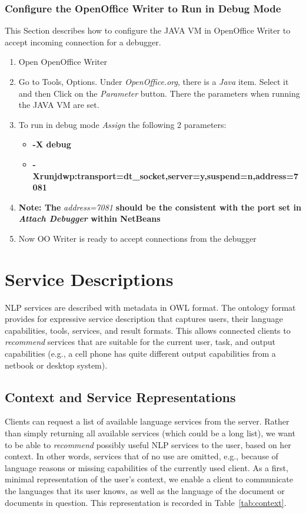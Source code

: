 \subsubsection{Configure the OpenOffice Writer to Run in Debug Mode}
This Section describes how to configure the JAVA VM in OpenOffice Writer to accept incoming connection for a debugger.

\begin{enumerate}
  \item Open OpenOffice Writer
  \item Go to Tools, Options. Under \emph{OpenOffice.org}, there is a \emph{Java} item. Select it and then Click on the 
        \emph{Parameter} button. There the parameters when running the JAVA VM are set.
  \item To run in debug mode \emph{Assign} the following 2 parameters:
  \begin{itemize}
    \item \textbf{-X debug}
    \item \textbf{-Xrunjdwp:transport=dt\_socket,server=y,suspend=n,address=7081}
  \end{itemize}
  \item \textbf{Note: The} \emph{address=7081} \textbf{should be the consistent with the port set in \emph{Attach Debugger} within NetBeans}
  \item  Now OO Writer is ready to accept connections from the debugger

\end{enumerate} 


\section{Service Descriptions}\label{sec:owl}
NLP services are described with metadata in OWL format. The ontology
format provides for expressive service description that captures
users, their language capabilities, tools, services, and result
formats. This allows connected clients to \emph{recommend} services
that are suitable for the current user, task, and output capabilities
(e.g., a cell phone has quite different output capabilities from a
netbook or desktop system). 


\subsection{Context and Service Representations}
\label{sec:contextservice}
Clients can request a list of available language services from the
server. Rather than simply returning all available services (which
could be a long list), we want to be able to \emph{recommend} possibly
useful NLP services to the user, based on her context.  In other
words, services that of no use are omitted, e.g., because of language
reasons or missing capabilities of the currently used client.  As a
first, minimal representation of the user's context, we enable a
client to communicate the languages that its user knows, as well as
the language of the document or documents in question. This
representation is recorded in Table~\ref{tab:context}.


